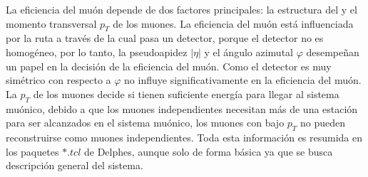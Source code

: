 La eficiencia del muón depende de dos factores principales: la estructura del \CMS y el momento transversal $p_T$ de los muones. La eficiencia del muón está influenciada por la ruta a través de la cual pasa un detector, porque el detector no es homogéneo, por lo tanto, la pseudoapidez $|\eta|$ y el ángulo azimutal $\varphi$ desempeñan un papel en la decisión de la eficiencia del muón. Como el detector es muy simétrico con respecto a $\varphi$ no influye significativamente en la eficiencia del muón. La $p_T$ de los muones decide si tienen suficiente energía para llegar al sistema muónico, debido a que los muones independientes necesitan más de una estación para ser alcanzados en el sistema muónico, los muones con bajo $p_T$ no pueden reconstruirse como muones independientes. Toda esta información es resumida en los paquetes $*.tcl$ de Delphes, aunque solo de forma básica ya que se busca descripción general del sistema.










